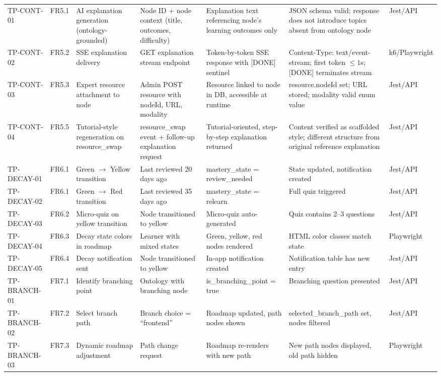 \begin{longtable}{p{1.8cm}p{1.5cm}p{2.2cm}p{2.2cm}p{2.5cm}p{1.8cm}p{1.2cm}}
TP-CONT-01 & FR5.1 & AI explanation generation (ontology-grounded) & Node ID + node context (title, outcomes, difficulty) & Explanation text referencing node's learning outcomes only & JSON schema valid; response does not introduce topics absent from ontology node & Jest/API \\
TP-CONT-02 & FR5.2 & SSE explanation delivery & GET explanation stream endpoint & Token-by-token SSE response with [DONE] sentinel & Content-Type: text/event-stream; first token $\le 1$s; [DONE] terminates stream & k6/Playwright \\
TP-CONT-03 & FR5.3 & Expert resource attachment to node & Admin POST resource with nodeId, URL, modality & Resource linked to node in DB, accessible at runtime & resource.nodeId set; URL stored; modality valid enum value & Jest/API \\
TP-CONT-04 & FR5.5 & Tutorial-style regeneration on resource\_swap & resource\_swap event + follow-up explanation request & Tutorial-oriented, step-by-step explanation returned & Content verified as scaffolded style; different structure from original reference explanation & Jest/API \\
TP-DECAY-01 & FR6.1 & Green $\rightarrow$ Yellow transition & Last reviewed 20 days ago & mastery\_state = review\_needed & State updated, notification created & Jest/API \\
TP-DECAY-02 & FR6.1 & Green $\rightarrow$ Red transition & Last reviewed 35 days ago & mastery\_state = relearn & Full quiz triggered & Jest/API \\
TP-DECAY-03 & FR6.2 & Micro-quiz on yellow transition & Node transitioned to yellow & Micro-quiz auto-generated & Quiz contains 2--3 questions & Jest/API \\
TP-DECAY-04 & FR6.3 & Decay state colors in roadmap & Learner with mixed states & Green, yellow, red nodes rendered & HTML color classes match state & Playwright \\
TP-DECAY-05 & FR6.4 & Decay notification sent & Node transitioned to yellow & In-app notification created & Notification table has new entry & Jest/API \\
TP-BRANCH-01 & FR7.1 & Identify branching point & Ontology with branching node & is\_branching\_point = true & Branching question presented & Jest/API \\
TP-BRANCH-02 & FR7.2 & Select branch path & Branch choice = ``frontend'' & Roadmap updated, path nodes shown & selected\_branch\_path set, nodes filtered & Jest/API \\
TP-BRANCH-03 & FR7.3 & Dynamic roadmap adjustment & Path change request & Roadmap re-renders with new path & New path nodes displayed, old path hidden & Playwright \\

\end{longtable}

